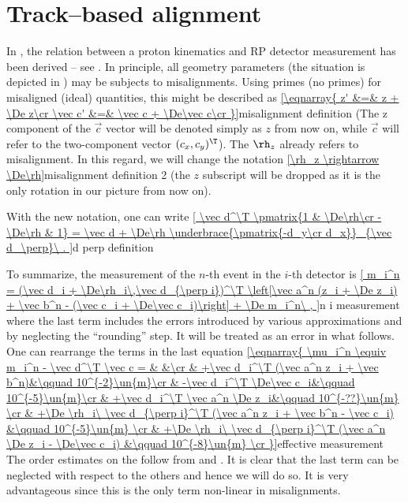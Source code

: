 
\section{Track--based alignment}


In , the relation between a proton kinematics and RP detector measurement has been derived -- see . In principle, all geometry parameters (the situation is depicted in ) may be subjects to misalignments. Using primes (no primes) for misaligned (ideal) quantities, this might be described as
\eqref{\eqnarray{
z' &=& z + \De z\cr
\vec c' &=& \vec c + \De\vec c\cr
}}{misalignment definition}
(The z component of the $\vec c$ vector will be denoted simply as $z$ from now on, while $\vec c$ will refer to the two-component vector $(c_x, c_y)^\T$). The $\rh_z$ already refers to misalignment. In this regard, we will change the notation
\eqref{\rh_z \rightarrow \De\rh}{misalignment definition 2}
(the $z$ subscript will be dropped as it is the only rotation in our picture from now on).

With the new notation, one can write
\eqref{
\vec d^\T \pmatrix{1 & \De\rh\cr -\De\rh & 1} =
\vec d + \De\rh \underbrace{\pmatrix{-d_y\cr d_x}}_{\vec d_\perp}\ .
}{d perp definition}


To summarize, the measurement of the $n$-th event in the $i$-th detector is
\eqref{
m_i^n = (\vec d_i + \De\rh_i\,\vec d_{\perp i})^\T \left[\vec a^n (z_i + \De z_i) + \vec b^n - (\vec c_i + \De\vec c_i)\right] + \De m_i^n\ ,
}{n i measurement}
where the last term includes the errors introduced by various approximations and by neglecting the ``rounding'' step. It will be treated as an error in what follows. One can rearrange the terms in the last equation
\eqref{\eqnarray{
\mu_i^n \equiv m_i^n - \vec d^\T \vec c = & &\cr
& +\vec d_i^\T (\vec a^n z_i + \vec b^n)&\qquad 10^{-2}\un{m}\cr
& -\vec d_i^\T \De\vec c_i&\qquad 10^{-5}\un{m}\cr
& +\vec d_i^\T \vec a^n \De z_i&\qquad 10^{-??}\un{m} \cr
& +\De \rh_i\ \vec d_{\perp i}^\T (\vec a^n z_i + \vec b^n - \vec c_i) &\qquad 10^{-5}\un{m} \cr
& +\De \rh_i\ \vec d_{\perp i}^\T (\vec a^n \De z_i - \De\vec c_i) &\qquad 10^{-8}\un{m} \cr
}}{effective measurement}
The order estimates on the \rhs{} follow from  and . It is clear that the last term can be neglected with respect to the others and hence we will do so. It is very advantageous since this is the only term non-linear in misalignments. 

